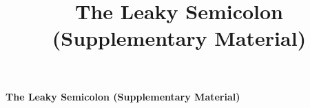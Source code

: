 \documentclass[acmsmall,screen]{acmart}\settopmatter{printfolios=true}
\title{The Leaky Semicolon (Supplementary Material)}
\theoremstyle{acmdefinition}
\begin{document}
\setcounter{page}{31}
\appendix
\noindent
{\LARGE \textsf{\textbf{The Leaky Semicolon (Supplementary Material)}}}
\bigskip







\end{document}
